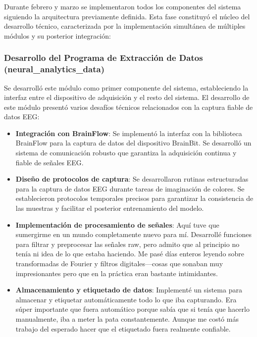Durante febrero y marzo se implementaron todos los componentes del sistema siguiendo la arquitectura previamente definida. Esta fase constituyó el núcleo del desarrollo técnico, caracterizada por la implementación simultánea de múltiples módulos y su posterior integración:

\subsubsection{Desarrollo del Programa de Extracción de Datos (neural\_analytics\_data)}

Se desarrolló este módulo como primer componente del sistema, estableciendo la interfaz entre el dispositivo de adquisición y el resto del sistema. El desarrollo de este módulo presentó varios desafíos técnicos relacionados con la captura fiable de datos EEG:

\begin{itemize}
    \item \textbf{Integración con BrainFlow}: Se implementó la interfaz con la biblioteca BrainFlow para la captura de datos del dispositivo BrainBit. Se desarrolló un sistema de comunicación robusto que garantiza la adquisición continua y fiable de señales EEG.
    
    \item \textbf{Diseño de protocolos de captura}: Se desarrollaron rutinas estructuradas para la captura de datos EEG durante tareas de imaginación de colores. Se establecieron protocolos temporales precisos para garantizar la consistencia de las muestras y facilitar el posterior entrenamiento del modelo.
    
    \item \textbf{Implementación de procesamiento de señales}: Aquí tuve que sumergirme en un mundo completamente nuevo para mí. Desarrollé funciones para filtrar y preprocesar las señales raw, pero admito que al principio no tenía ni idea de lo que estaba haciendo. Me pasé días enteros leyendo sobre transformadas de Fourier y filtros digitales—cosas que sonaban muy impresionantes pero que en la práctica eran bastante intimidantes.
    
    \item \textbf{Almacenamiento y etiquetado de datos}: Implementé un sistema para almacenar y etiquetar automáticamente todo lo que iba capturando. Era súper importante que fuera automático porque sabía que si tenía que hacerlo manualmente, iba a meter la pata constantemente. Aunque me costó más trabajo del esperado hacer que el etiquetado fuera realmente confiable.
\end{itemize}

